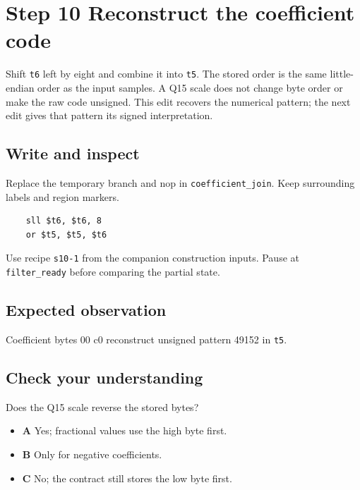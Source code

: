 \section{Step 10 Reconstruct the coefficient code}\label{fir-s10}

Shift \texttt{t6} left by eight and combine it into \texttt{t5}. The stored order is the same little-endian order as the input samples. A Q15 scale does not change byte order or make the raw code unsigned. This edit recovers the numerical pattern; the next edit gives that pattern its signed interpretation.

\subsection{Write and inspect}
Replace the temporary branch and nop in \texttt{coefficient\_join}. Keep surrounding labels and region markers.

\begin{verbatim}
    sll $t6, $t6, 8
    or $t5, $t5, $t6
\end{verbatim}
Use recipe \texttt{s10-1} from the companion construction inputs. Pause at \texttt{filter\_ready} before comparing the partial state.

\subsection{Expected observation}
Coefficient bytes 00 c0 reconstruct unsigned pattern 49152 in \texttt{t5}.

\subsection{Check your understanding}
Does the Q15 scale reverse the stored bytes?

\begin{itemize}
  \item \textbf{A} Yes; fractional values use the high byte first.
  \item \textbf{B} Only for negative coefficients.
  \item \textbf{C} No; the contract still stores the low byte first.
\end{itemize}
